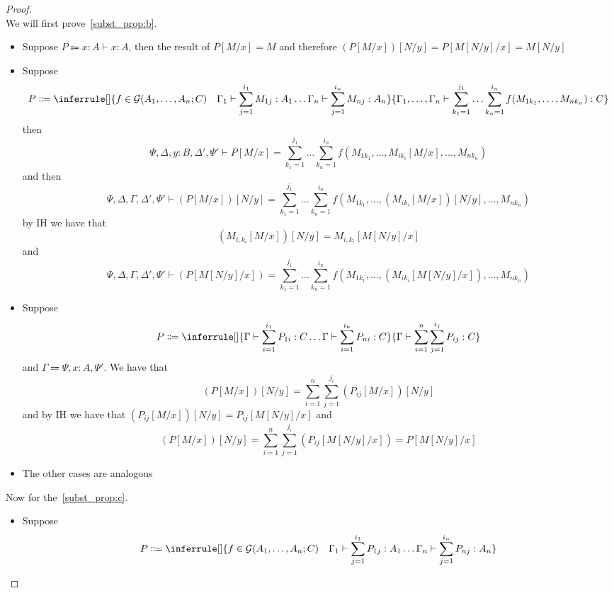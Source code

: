 \begin{proof}
  \leavevmode\\
  We will first prove~\autoref{subst_prop:b}.
  \begin{itemize}
    \item Suppose $P \Coloneqq x : A \vdash x : A$, then the result of $P[M/x] = M$ and therefore $(P[M/x])[N / y] = P[M[N/y]/x] = M[N/y]$
    \item Suppose 
    \begin{gather*}
      P \Coloneqq \inferrule[]{
        f \in \mathcal{G}(A_1, \ldots, A_n;C) \quad \Gamma_1 \vdash \sum_{j=1}^{i_1} M_{1j} : A_1 \ldots \Gamma_n \vdash \sum_{j=1}^{i_n}M_{nj} : A_n
        }{
          \Gamma_1, \ldots, \Gamma_n \vdash \sum_{k_1=1}^{j_1}\ldots\sum_{k_n=1}^{i_n}f(M_{1k_1},\ldots,M_{nk_{n}}): C
        }
    \end{gather*}
    then 
    \[
    \Psi, \Delta, y : B, \Delta', \Psi' \vdash P[M/x] = \sum_{k_1=1}^{j_1}\ldots\sum_{k_n=1}^{i_n}f(M_{1k_1},\ldots, M_{ik_i}[M/x] ,\ldots,M_{nk_{n}})
    \]
    and then 
    \[
    \Psi,\Delta,\Gamma,\Delta',\Psi' \vdash (P[M/x])[N/y] = \sum_{k_1=1}^{j_1}\ldots\sum_{k_n=1}^{i_n}f(M_{1k_1},\ldots, (M_{ik_i}[M/x])[N/y] ,\ldots,M_{nk_{n}})
    \]
    by IH we have that
    \[
      (M_{i,k_i}[M/x])[N/y] = M_{i,k_i}[M[N/y]/x]
    \]
    and
    \[
      \Psi,\Delta,\Gamma,\Delta',\Psi' \vdash (P[M[N/y]/x]) = \sum_{k_1=1}^{j_1}\ldots\sum_{k_n=1}^{i_n}f(M_{1k_1},\ldots, (M_{ik_i}[M[N/y] / x]) ,\ldots,M_{nk_{n}})
    \]
    \item Suppose 
    \begin{gather*}
    P \Coloneqq \inferrule[]{\Gamma \vdash \sum_{i=1}^{i_1}P_{1i} : C \ldots \Gamma \vdash \sum_{i=1}^{i_n}P_{ni} : C}{\Gamma \vdash \sum_{i=1}^{n}\sum_{j=1}^{i_j}P_{ij} : C}
    \end{gather*}
    and $\Gamma \Coloneqq \Psi, x : A, \Psi'$.
    We have that 
    \[
    (P[M/x])[N/y] = \sum_{i=1}^{n}\sum_{j=1}^{j_i}(P_{ij}[M/x])[N/y]
    \] 
    and by IH we have that $(P_{ij}[M/x])[N/y] = P_{ij}[M[N/y]/x]$ and
    \[
      (P[M/x])[N/y] = \sum_{i=1}^{n}\sum_{j=1}^{j_i}(P_{ij}[M[N/y]/x]) = P[M[N/y]/x]
    \]
    \item The other cases are analogous
  \end{itemize}
  Now for the~\autoref{subst_prop:c}.
  \begin{itemize}
    \item Suppose
      \begin{gather*}
        P \Coloneqq \inferrule[]{
          f \in \mathcal{G}(A_1, \ldots, A_n;C) \quad \Gamma_1 \vdash \sum_{j=1}^{i_1} P_{1j} : A_1 \ldots \Gamma_n \vdash \sum_{j=1}^{i_n}P_{nj} : A_n
}
\end{gather*}
\end{itemize}
\end{proof}
